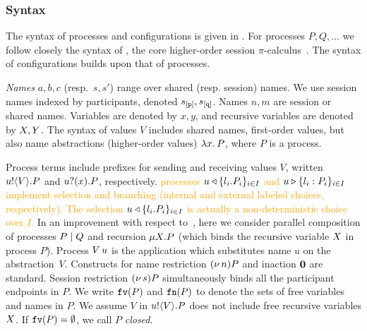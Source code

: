 \documentclass[runningheads]{llncs}
\newcommand{\erase}[1]{\textcolor{orange}{#1}}
\begin{document}
\subsubsection{Syntax}
The syntax of processes and configurations is given in .
For processes $P, Q, \ldots$ we
follow closely the syntax of \HOp, the core higher-order session $\pi$-calculus~\cite{KPY2016}.
The syntax of configurations builds upon that of processes.

\emph{Names} $a,b,c$ (resp.~$s, s'$) 
range over shared (resp. session) names. 
We use session names indexed by  {participants}, denoted $s_{[\mathtt{p}]}, s_{[\mathtt{q}]}$. 
Names $n, m$ are session or shared names.
Variables are denoted by $x, y$, 
and recursive variables are denoted by $X, Y$.
The syntax of values $V$ includes shared names, first-order values, but also 
name abstractions (higher-order values)
$\lambda x.\,P$,   where $P$ is a process.

Process terms include   prefixes for sending and receiving values $V$, written 
$u ! \langle V \rangle . P$ and $u ? (x) . P$, respectively.
\erase{
processes $u \triangleleft \{l_i. P_i\}_{i\in I}$ and $u \triangleright \{l_i: P_i\}_{i \in I}$ implement 
selection and branching (internal and external labeled choices, respectively). 
The selection  $u \triangleleft \{l_i. P_i\}_{i\in I}$ is actually 
a non-deterministic choice over $I$.}
In an improvement with respect to~\cite{DBLP:journals/corr/MezzinaP16,MezzinaP17}, here we consider parallel composition of processes $P \;|\; Q$ 
and recursion $\mu X. P$ (which binds the recursive variable $X$ in process $P$).
Process 
$V\, {u}$ 
is the application
which substitutes name $u$ on the abstraction~$V$. %
Constructs for 
name restriction $(\nu\, n) P$ and 
inaction $\mathbf{0}$ are standard.
Session restriction $(\nu\, s) P$ simultaneously binds all the participant endpoints in $P$.
We write $\mathtt{fv}(P)$ and $\mathtt{fn}(P)$ %
to denote the sets of free 
variables 
and names in $P$.
We assume $V$ in $u ! \langle V \rangle .{P}$ does not include free recursive 
variables $X$.
If $\mathtt{fv}(P) = \emptyset$, we call $P$ {\em closed}.
\end{document}

